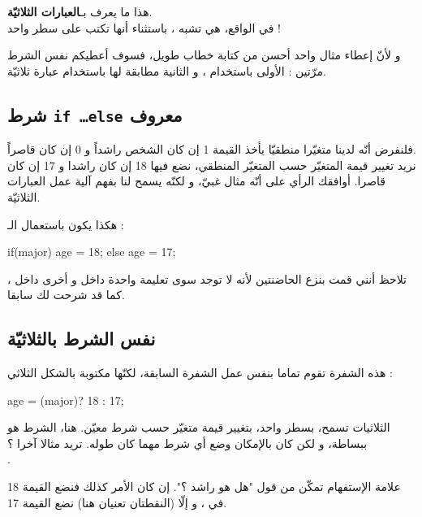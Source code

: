 هذا ما يعرف بـ\textbf{العبارات الثلاثيّة}.\\
في الواقع، هي تشبه
،
باستثناء أنها تكتب على سطر واحد !

و لأنّ إعطاء مثال واحد أحسن من كتابة خطاب طويل، فسوف أعطيكم نفس الشرط مرّتين : الأولى باستخدام
،
و الثانية مطابقة لها باستخدام عبارة ثلاثيّة.
\subsection{شرط \texttt{if \dots else} معروف}

فلنفرض أنّه لدينا متغيّرا منطقيّا
يأخذ القيمة 1 إن كان الشخص راشداً و 0 إن كان قاصراً.\\
نريد تغيير قيمة المتغيّر 
حسب المتغيّر المنطقي، نضع فيها 18 إن كان راشدا و 17 إن كان قاصرا. أوافقك الرأي على أنّه مثال غبيّ، و لكنّه يسمح لنا بفهم آلية عمل العبارات الثلاثيّة.

هكذا يكون باستعمال الـ :

\begin{Csource}
if(major)
	age = 18;
else
	age = 17;
\end{Csource}

\begin{information}
تلاحظ أنني قمت بنزع الحاضنتين لأنه لا توجد سوى تعليمة واحدة داخل 
و أخرى داخل 
،
كما قد شرحت لك سابقا.
\end{information}

\subsection{نفس الشرط بالثلاثيّة}

هذه الشفرة تقوم تماما بنفس عمل الشفرة السابقة، لكنّها مكتوبة بالشكل الثلاثي : 

\begin{Csource}
age = (major)? 18 : 17;
\end{Csource}

الثلاثيات تسمح، بسطر واحد، بتغيير قيمة متغيّر حسب شرط معيّن. هنا، الشرط هو
ببساطة، و لكن كان بالإمكان وضع أي شرط مهما كان طوله. تريد مثالا آخرا ؟\\ 
.

علامة الإستفهام تمكّن من قول "هل هو راشد ؟". إن كان الأمر كذلك فنضع القيمة 18 في
،
و إلّا (النقطتان تعنيان
هنا) نضع القيمة 17.

